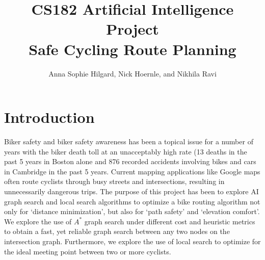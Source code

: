 \documentclass[11pt]{article}
\title{CS182 Artificial Intelligence Project \\ \Large{Safe Cycling Route Planning}}
\author{Anna Sophie Hilgard, Nick Hoernle, and Nikhila Ravi}
\begin{document}
\maketitle{}



\setlength{\parindent}{2em}
\setlength{\parskip}{1em}
\renewcommand{\baselinestretch}{1.3}

\section{Introduction}

Biker safety and biker safety awareness has been a topical issue for a number of years with the biker death toll at an unacceptably high rate (13 deaths in the past 5 years in Boston alone and 876 recorded accidents involving bikes and cars in Cambridge in the past 5 years. Current mapping applications like Google maps often route cyclists through busy streets and intersections, resulting in unnecessarily dangerous trips. The purpose of this project has been to explore AI graph search and local search algorithms to optimize a bike routing algorithm not only for `distance minimization', but also for `path safety' and `elevation comfort'. We explore the use of $A^{*}$ graph search under different cost and heuristic metrics to obtain a fast, yet reliable graph search between any two nodes on the intersection graph. Furthermore, we explore the use of local search to optimize for the ideal meeting point between two or more cyclists.


\end{document}
